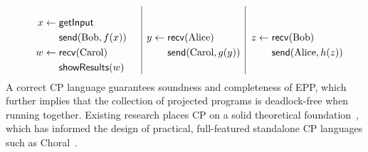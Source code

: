 \[
\begin{minipage}{.35\textwidth}
  \begin{equation*}
    \begin{split}
      x \leftarrow \; & \mathsf{getInput} \\
                      & \mathsf{send}(\mathrm{Bob}, f(x)) \\
      w \leftarrow \; & \mathsf{recv}(\mathrm{Carol}) \\
                      & \mathsf{showResults}(w)
    \end{split}
  \end{equation*}
\end{minipage}
\hfill\vline\hfill
\begin{minipage}{.3\textwidth}
  \begin{equation*}
    \begin{split}
      y \leftarrow \; & \mathsf{recv}(\mathrm{Alice}) \\
                      & \mathsf{send}(\mathrm{Carol}, g(y)) \\
    \end{split}
  \end{equation*}
\end{minipage}
\hfill\vline\hfill
\begin{minipage}{.3\textwidth}
  \begin{equation*}
    \begin{split}
      z \leftarrow \; & \mathsf{recv}(\mathrm{Bob}) \\
                      & \mathsf{send}(\mathrm{Alice}, h(z)) \\
    \end{split}
  \end{equation*}
\end{minipage}
\]
%
A correct CP language guarantees soundness and completeness of EPP, which further implies that the collection of projected programs is deadlock-free when running together.
%
Existing research places CP on a solid theoretical foundation~\citep{montesi-2013, cruzfilipe-2020, cruzfilipe-2022, hirsch-2022},
%
which has informed the design of practical, full-featured standalone CP languages such as Choral~\citep{giallorenzo-2024}.

